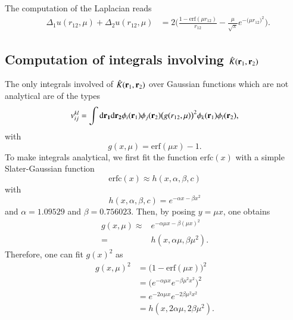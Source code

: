 \documentclass[aip,jcp,reprint,noshowkeys,superscriptaddress,twocolumn]{revtex4-1}
\newcommand{\bri}[1]{{\bf r}_{#1}}
\newcommand{\dr}[1]{\text{d}{\bf r_{#1}}}
\begin{document}
The computation of the Laplacian reads 
\begin{equation}
 \begin{aligned}
 \label{eq:d2_x1_2}
 &\Delta_1 u(r_{12},\mu) + \Delta_2 u(r_{12},\mu)
 & = 2  \bigg( \frac{1 - \text{erf}(\mu r_{12})}{r_{12}} - \frac{\mu}{\sqrt{\pi}} e^{-\big(\mu r_{12} \big)^2}  \bigg).
 \end{aligned}
\end{equation}

\subsection{Computation of integrals involving $\hat{K}(\bri{1},\bri{2})$} 
\label{sec:integrals}
The only integrals involved of $\hat{K}(\bri{1},\bri{2})$ over Gaussian functions which are not analytical are of the types 
\begin{equation}
 \label{eq:k_ijkl}
 v_{ij}^{kl} = \int \dr{1} \dr{2} \phi_i(\bri{1}) \phi_j(\bri{2}) \big( g(r_{12},\mu) \big)^2  \phi_k(\bri{1}) \phi_l(\bri{2}),  
\end{equation}
with 
\begin{equation}
 g(x, \mu)= \text{erf}( \mu x) - 1.
\end{equation}
To make integrals analytical, we first fit the function $\text{erfc}(x)$ with a simple Slater-Gaussian function 
\begin{equation}
 \text{erfc}(x) \approx h(x,\alpha,\beta,c)
\end{equation}
with 
\begin{equation}
 h(x,\alpha,\beta,c) = e^{-\alpha x - \beta x^2}
\end{equation}
and $\alpha=1.09529$ and $\beta = 0.756023$. 
Then, by posing $y=\mu x$, one obtains 
\begin{equation}
 \label{fit_erf}
 \begin{aligned}
  g(x,\mu)  \approx & e^{-\alpha \mu x - \beta (\mu x)^2}\\ 
        =& h(x,\alpha \mu, \beta \mu^2).
 \end{aligned}
\end{equation}
Therefore, one can fit $g(x)^2$ as 
\begin{equation}
 \begin{aligned}
 g(x,\mu)^2&= \bigg( 1 - \text{erf}(\mu x) \bigg)^2\\
           &= \bigg( e^{-\alpha \mu x } e^{-\beta \mu^2 x^2}\bigg)^2 \\
           &= e^{-2\alpha  \mu x } e^{-2 \beta \mu^2 x^2} \\
           &= h(x,2 \alpha \mu, 2 \beta \mu^2).
 \end{aligned}
\end{equation}
\end{document}
